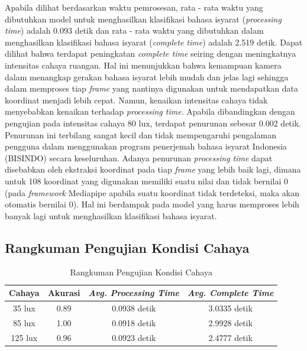 Apabila dilihat berdasarkan waktu pemrosesan, rata - rata waktu yang dibutuhkan model untuk menghasilkan klasifikasi bahasa isyarat (\emph{processing time}) adalah 0.093 detik dan rata - rata waktu yang dibutuhkan dalam menghasilkan klasifikasi bahasa isyarat (\emph{complete time}) adalah 2.519 detik. Dapat dilihat bahwa terdapat peningkatan \emph{complete time} seiring dengan meningkatnya intensitas cahaya ruangan. Hal ini menunjukkan bahwa kemampuan kamera dalam menangkap gerakan bahasa isyarat lebih mudah dan jelas lagi sehingga dalam memproses tiap \emph{frame} yang nantinya digunakan untuk mendapatkan data koordinat menjadi lebih cepat. Namun, kenaikan intensitas cahaya tidak menyebabkan kenaikan terhadap \emph{processing time}. Apabila dibandingkan dengan pengujian pada intensitas cahaya 80 lux, terdapat penurunan sebesar 0.002 detik. Penurunan ini terbilang sangat kecil dan tidak mempengaruhi pengalaman pengguna dalam menggunakan program penerjemah bahasa isyarat Indonesia (BISINDO) secara keseluruhan. Adanya penurunan \emph{processing time} dapat disebabkan oleh ekstraksi koordinat pada tiap \emph{frame} yang lebih baik lagi, dimana untuk 108 koordinat yang digunakan memiliki suatu nilai dan tidak bernilai 0 (pada \emph{framework} Mediapipe apabila suatu koordinat tidak terdeteksi, maka akan otomatis bernilai 0). Hal ini berdampak pada model yang harus memproses lebih banyak lagi untuk menghasilkan klasifikasi bahasa isyarat.

\subsection{Rangkuman Pengujian Kondisi Cahaya}
\label{sec:analisisrangkumancahaya}

\begin{longtable}{|c|c|c|c|}
  \caption{Rangkuman Pengujian Kondisi Cahaya}
  \label{tb:evaluasiCahaya}                                   \\
  \hline
  \rowcolor[HTML]{C0C0C0}
  \textbf{Cahaya} & \textbf{Akurasi} & \emph{\textbf{Avg. Processing Time}} & \emph{\textbf{Avg. Complete Time}} \\
  \hline
  35 lux & 0.89 & 0.0938 detik & 3.0335 detik \\
  85 lux & 1.00 & 0.0918 detik & 2.9928 detik \\
  125 lux & 0.96& 0.0923 detik & 2.4777 detik \\
  \hline
\end{longtable}

